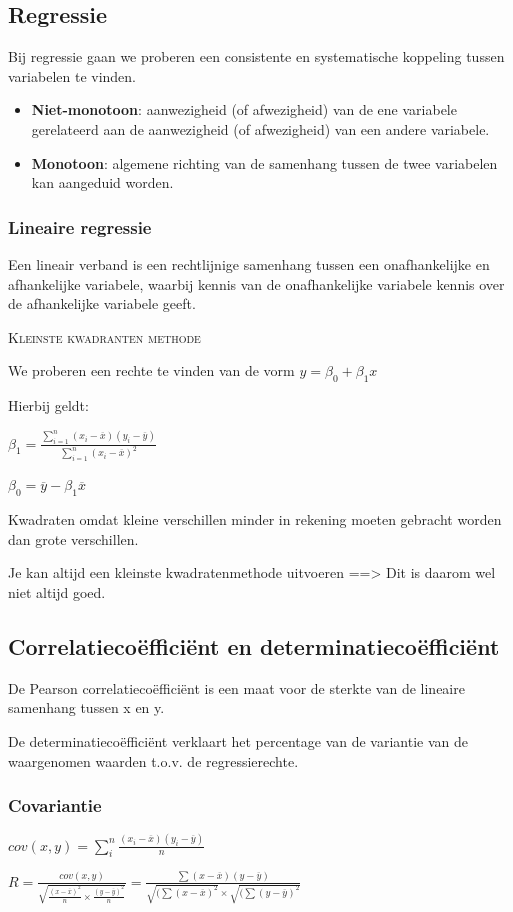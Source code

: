 \documentclass[a4paper,12pt]{article}
\begin{document}
\subsection{Regressie}
Bij regressie gaan we proberen een consistente en systematische koppeling tussen variabelen te vinden.

\begin{itemize}
\item	\textbf{Niet-monotoon}: aanwezigheid (of afwezigheid) van de ene variabele gerelateerd aan de aanwezigheid (of afwezigheid) van een andere variabele.
\item	\textbf{Monotoon}: algemene richting van de samenhang tussen de twee variabelen kan aangeduid worden.
\end{itemize}

\subsubsection{Lineaire regressie}
Een lineair verband is een rechtlijnige samenhang tussen een onafhankelijke en afhankelijke variabele, waarbij kennis van de onafhankelijke variabele kennis over de afhankelijke variabele geeft.

\textsc{Kleinste kwadranten methode}

We proberen een rechte te vinden van de vorm $y=\beta_0+\beta_1x$

Hierbij geldt:

$\beta_1 = 
\frac
{\sum^n_{i=1}(x_i-\overline{x})(y_i-\overline{y})}
{\sum^n_{i=1}(x_i - \overline{x})^2}$

$\beta_0 = \overline{y} - \beta_1 \overline{x}$

Kwadraten omdat kleine verschillen minder in rekening moeten gebracht worden dan grote verschillen.
	
Je kan altijd een kleinste kwadratenmethode uitvoeren ==> Dit is daarom wel niet altijd goed.

\subsection{Correlatiecoëfficiënt en determinatiecoëfficiënt}
De Pearson correlatiecoëfficiënt is een maat voor de sterkte van de lineaire samenhang tussen x en y.

De determinatiecoëfficiënt verklaart het percentage van de variantie van de waargenomen waarden t.o.v. de regressierechte.

\subsubsection{Covariantie}
$cov(x,y) = \sum^n_i 
\frac
{(x_i-\overline{x})(y_i-\overline{y})}
{n}$

$R=\frac
{cov(x,y)}
{\sqrt{\frac{(x-\overline{x})^2}{n}\times \frac{(y-\overline{y})^2}{n}}}=
\frac{\sum(x-\overline{x})(y-\overline{y})}
{\sqrt{(\sum (x-\overline{x})^2} \times \sqrt{(\sum (y-\overline{y})^2}}$
\end{document}
